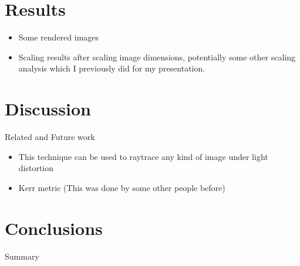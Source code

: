 \section{Results}
\label{sec:results}

\begin{itemize}
	\item Some rendered images
    	\item Scaling results after scaling image dimensions, potentially some other scaling analysis 
      which I previously did for my presentation.
\end{itemize}



\section{Discussion}
\label{sec:disc}

Related and Future work
\begin{itemize}
	\item This technique can be used to raytrace any kind of image under light distortion
    	\item Kerr metric (This was done by some other people before)
\end{itemize}


\section{Conclusions}
\label{sec:concl}

Summary


